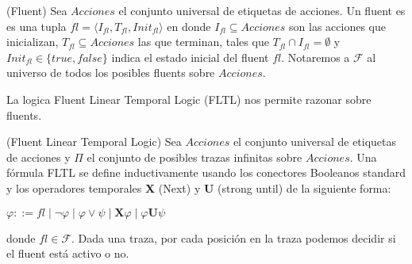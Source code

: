 \begin{definition}{(Fluent)}
Sea $Acciones$ el conjunto universal de etiquetas de acciones. 
Un fluent es es una tupla $fl = \langle I_{fl}, T_{fl}, Init_{fl} \rangle$ en 
donde $I_{fl} \subseteq Acciones$ son las acciones 
que inicializan, $T_{fl} \subseteq Acciones$ las que terminan, tales que 
$T_{fl} \cap I_{fl} = \emptyset$ y $Init_{fl} \in \{true, false\}$ indica el 
estado inicial del fluent $fl$. Notaremos a $\mathcal{F}$ al universo de todos 
los posibles fluents sobre $Acciones$.
\end{definition}

La logica Fluent Linear Temporal Logic \cite{FLTL} (FLTL) nos permite razonar 
sobre fluents.

\begin{definition}{(Fluent Linear Temporal Logic)}
Sea $Acciones$ el conjunto universal de etiquetas de acciones y $\Pi$ el conjunto de posibles trazas infinitas sobre $Acciones$. 
Una fórmula FLTL se define inductivamente usando los conectores Booleanos standard y los operadores temporales \textbf{X} (Next) y 
\textbf{U} (strong until) de la siguiente forma:

\begin{center}
$\varphi ::= fl \;|\; \neg\varphi \;|\; \varphi \lor \psi \;|\; 
\textbf{X}\varphi \;|\; \varphi\textbf{U}\psi$ 
\end{center}

\end{definition}

donde $fl \in \mathcal{F}$. Dada una traza, por cada posición en la traza 
podemos 
decidir si el fluent está activo o no.

